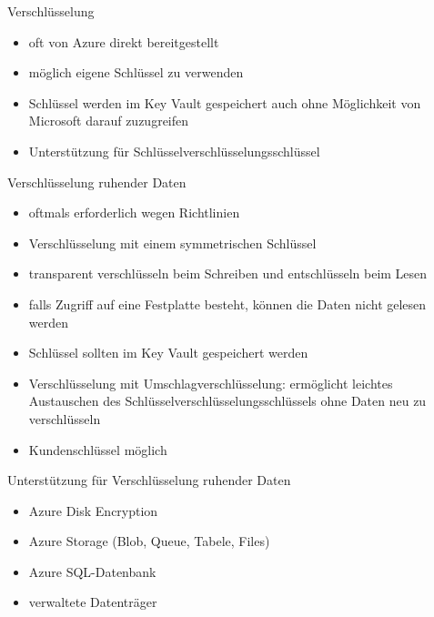 
\begin{flashcard}[Definition]{Verschlüsselung}
  \begin{itemize}
    \item oft von Azure direkt bereitgestellt
    \item möglich eigene Schlüssel zu verwenden
    \item Schlüssel werden im Key Vault gespeichert\newline
      auch ohne Möglichkeit von Microsoft darauf zuzugreifen
    \item Unterstützung für Schlüsselverschlüsselungsschlüssel
  \end{itemize}
\end{flashcard}

\begin{flashcard}[Definition]{Verschlüsselung ruhender Daten}
  \begin{itemize}
    \item oftmals erforderlich wegen Richtlinien
    \item Verschlüsselung mit einem symmetrischen Schlüssel
    \item transparent verschlüsseln beim Schreiben und entschlüsseln beim Lesen
    \item falls Zugriff auf eine Festplatte besteht, können die Daten nicht gelesen werden
    \item Schlüssel sollten im Key Vault gespeichert werden
    \item Verschlüsselung mit Umschlagverschlüsselung:\newline
      ermöglicht leichtes Austauschen des Schlüsselverschlüsselungsschlüssels ohne Daten neu zu verschlüsseln
    \item Kundenschlüssel möglich
  \end{itemize}
\end{flashcard}

\begin{flashcard}[Definition]{Unterstützung für Verschlüsselung ruhender Daten}
  \begin{itemize}
    \item Azure Disk Encryption
    \item Azure Storage (Blob, Queue, Tabele, Files)
    \item Azure SQL-Datenbank
    \item verwaltete Datenträger
  \end{itemize}
\end{flashcard}


